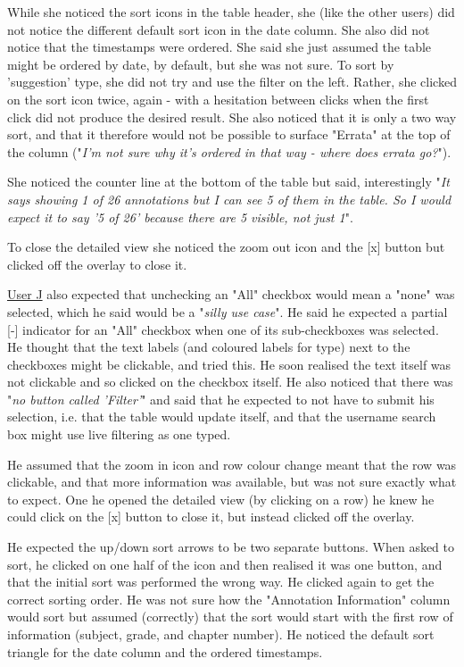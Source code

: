 While she noticed the sort icons in the table header, she (like the other users) did not notice the different default sort icon in the date column. She also did not notice that the timestamps were ordered. She said she just assumed the table might be ordered by date, by default, but she was not sure. To sort by 'suggestion' type, she did not try and use the filter on the left. Rather, she clicked on the sort icon twice, again - with a hesitation between clicks when the first click did not produce the desired result. She also noticed that it is only a two way sort, and that it therefore would not be possible to surface "Errata" at the top of the column ("\textit{I'm not sure why it's ordered in that way - where does errata go?}").

She noticed the counter line at the bottom of the table but said, interestingly "\textit{It says showing 1 of 26 annotations but I can see 5 of them in the table. So I would expect it to say '5 of 26' because there are 5 visible, not just 1}". 

To close the detailed view she noticed the zoom out icon and the [x] button but clicked off  the overlay to close it. 

\underline{User J} also expected that unchecking an "All" checkbox would mean a "none" was selected, which he said would be a "\textit{silly use case}". He said he expected a partial [-] indicator for an "All" checkbox when one of its sub-checkboxes was selected. He thought that the text labels (and coloured labels for type) next to the checkboxes might be clickable, and tried this. He soon realised the text itself was not clickable and so clicked on the checkbox itself. He also noticed  that there was "\textit{no button called 'Filter'}" and said that he expected to not have to submit his selection, i.e. that the table would update itself, and that the username search box might use live filtering as one typed. 

He assumed that the zoom in icon and row colour change meant that the row was clickable, and that more information was available, but was not sure exactly what to expect. One he opened the detailed view (by clicking on a row) he knew he could click on the [x] button to close it, but instead clicked off the overlay. 

He expected the up/down sort arrows to be two separate buttons. When asked to sort, he clicked on one half of the icon and then realised it was one button, and that the initial sort was performed the wrong way. He clicked again to get the correct sorting order. He was not sure how the "Annotation Information" column would sort but assumed (correctly) that the sort would start with the first row of information (subject, grade, and chapter number). He noticed the default sort triangle for the date column and  the ordered timestamps. 

